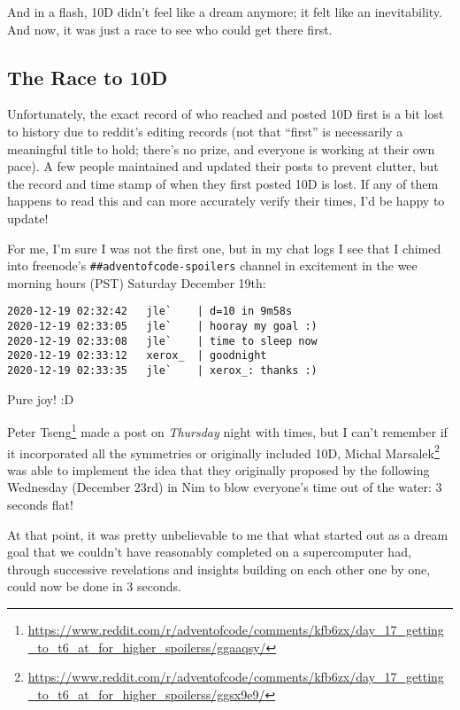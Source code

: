 \documentclass[]{article}
\renewcommand{\href}[2]{#2\footnote{\url{#1}}}
\begin{document}
And in a flash, 10D didn't feel like a dream anymore; it felt like an
inevitability. And now, it was just a race to see who could get there first.

\hypertarget{the-race-to-10d}{%
\subsection{The Race to 10D}\label{the-race-to-10d}}

Unfortunately, the exact record of who reached and posted 10D first is a bit
lost to history due to reddit's editing records (not that ``first'' is
necessarily a meaningful title to hold; there's no prize, and everyone is
working at their own pace). A few people maintained and updated their posts to
prevent clutter, but the record and time stamp of when they first posted 10D is
lost. If any of them happens to read this and can more accurately verify their
times, I'd be happy to update!

For me, I'm sure I was not the first one, but in my chat logs I see that I
chimed into freenode's \texttt{\#\#adventofcode-spoilers} channel in excitement
in the wee morning hours (PST) Saturday December 19th:

\begin{verbatim}
2020-12-19 02:32:42   jle`    | d=10 in 9m58s
2020-12-19 02:33:05   jle`    | hooray my goal :)
2020-12-19 02:33:08   jle`    | time to sleep now
2020-12-19 02:33:12   xerox_  | goodnight
2020-12-19 02:33:35   jle`    | xerox_: thanks :)
\end{verbatim}

Pure joy! :D

\href{https://www.reddit.com/r/adventofcode/comments/kfb6zx/day_17_getting_to_t6_at_for_higher_spoilerss/ggaaqsy/}{Peter
Tseng} made a post on \emph{Thursday} night with times, but I can't remember if
it incorporated all the symmetries or originally included 10D,
\href{https://www.reddit.com/r/adventofcode/comments/kfb6zx/day_17_getting_to_t6_at_for_higher_spoilerss/ggsx9e9/}{Michal
Marsalek} was able to implement the idea that they originally proposed by the
following Wednesday (December 23rd) in Nim to blow everyone's time out of the
water: 3 seconds flat!

At that point, it was pretty unbelievable to me that what started out as a dream
goal that we couldn't have reasonably completed on a supercomputer had, through
successive revelations and insights building on each other one by one, could now
be done in 3 seconds.
\end{document}
